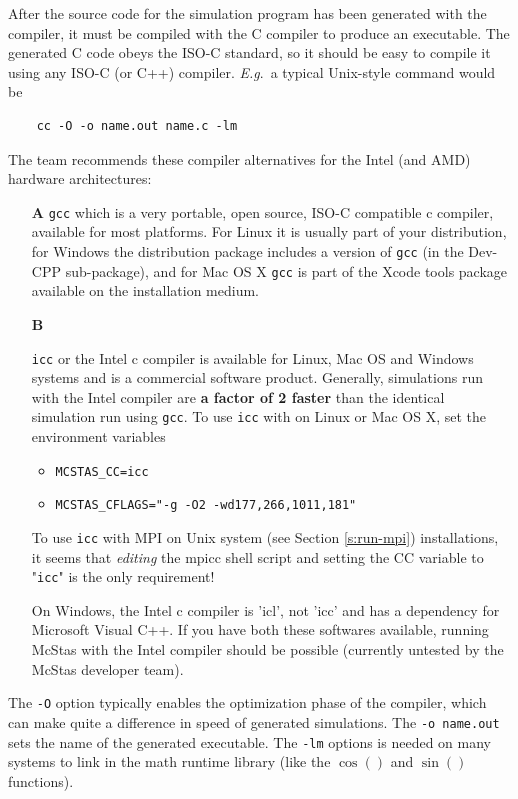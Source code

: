 After the source code for the simulation program has been generated with the
\MCS compiler, it must be compiled with the C compiler to produce an
executable. The generated C code obeys the ISO-C standard, so it should be easy
to compile it using any ISO-C (or C++) compiler. \textit{E.g}.\ a typical
Unix-style command would be
\begin{lstlisting}
    cc -O -o name.out name.c -lm
\end{lstlisting}
The \MCS team recommends these compiler alternatives for the Intel (and AMD)
hardware architectures:
\begin{itemize}
\item[\bf A]{\verb+gcc+ which is a very portable, open source, ISO-C compatible
    c compiler, available for most platforms. For Linux it is usually part of
    your distribution, for Windows the \MCS distribution package includes a
    version of \verb+gcc+ (in the Dev-CPP sub-package), and for Mac OS X
    \verb+gcc+ is part of the Xcode tools package available on the installation
    medium.}
\item[\bf B]{\verb+icc+ or the Intel c compiler is available for Linux, Mac OS
    and Windows systems and is a commercial software product. Generally,
    simulations run with the Intel compiler are {\bf a factor of 2 faster} than
    the identical simulation run using \verb+gcc+. To use \verb+icc+ with \MCS
    on Linux or Mac OS X, set the environment variables
    \begin{itemize}
      \item{\verb+MCSTAS_CC=icc+}
      \item{\verb+MCSTAS_CFLAGS="-g -O2 -wd177,266,1011,181"+}
    \end{itemize}
    To use \verb+icc+ with MPI on Unix system (see Section \ref{s:run-mpi})
 installations, it seems that \emph{editing}
    the mpicc shell script and setting the CC variable to "\verb+icc+" is the
    only requirement!}
  On Windows, the Intel c compiler is 'icl', not 'icc' and has a dependency for
  Microsoft Visual C++. If you have both these softwares available, running
  McStas with the Intel compiler should be possible (currently untested by the
  McStas developer team).

\end{itemize}


The \verb+-O+ option typically enables the optimization phase of the compiler,
which can make quite a difference in speed of \MCS generated simulations. The
\verb+-o name.out+ sets the name of the generated executable. The \verb+-lm+
options is needed on many systems to link in the math runtime library (like the
$\cos()$ and $\sin()$ functions). 

